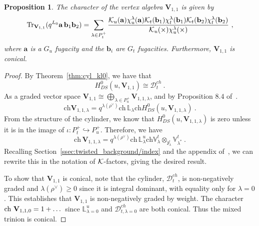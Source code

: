 \documentclass[a4paper]{article}
\newtheorem{prop}[thm]{Proposition}
\def\IV{\mathbb{V}}
\def\IL{\mathbb{L}}
\def\KK{{\cal K}}
\def\ch{{\rm ch}}
\def \zf{\mathfrak{z}}
\def\D{\mathcal{D}^{ch}}
\def\V{\mathbf{V}}
\begin{document}
\begin{prop}\label{prop:mixed_trin_char}
The character of the vertex algebra $\V_{1,1}$ is given by
\begin{equation*}
	\mathrm{Tr}_{\V_{1,1}}(q^{L_0}\mathbf{a}\,\mathbf{b}_1\mathbf{b}_2) = \sum_{\lambda\in P_t^+} \frac{\KK_u(\mathbf{a})\chi^\lambda_u(\mathbf{a})\KK_t(\mathbf{b}_1)\chi_t^\lambda(\mathbf{b}_1)\KK_t(\mathbf{b}_2) \chi_t^\lambda(\mathbf{b}_2)}{\KK_u(\times)\chi_u^\lambda(\times)} ~,
\end{equation*}
where $\mathbf{a}$ is a $G_u$ fugacity and the $\mathbf{b}_i$ are $G_t$ fugacities. Furthermore, $\V_{1,1}$ is conical.
\end{prop}
\begin{proof}
By Theorem~\ref{thm:cyl_kl0}, we have that
\begin{equation*}
	H^0_{DS}(u, \V_{1,1}) \cong \D_t~.
\end{equation*}
As a graded vector space $\V_{1,1}\cong \bigoplus_{\lambda\in P_u^+} \V_{1,1,\lambda}$, and by Proposition $8.4$ of~\cite{Arakawa:2018egx}.
\begin{equation*}
	\mathrm{ch} \V_{1,1,\lambda} = q^{\lambda(\rho^\vee)}\mathrm{ch}\, \mathbb{L}_\lambda \mathrm{ch}H^0_{DS}(u,\V_{1,1,\lambda})~.
\end{equation*}
From the structure of the cylinder, we know that $H^0_{DS}(u,\V_{1,1,\lambda})$ is zero unless it is in the image of $\iota:P_t^+ \hookrightarrow P_u^+$. Therefore, we have
\begin{equation*}
	\mathrm{ch}\, \V_{1,1,\lambda} = q^{\lambda(\rho^\vee)}\mathrm{ch}\, \mathbb{L}^u_\lambda \mathrm{ch} \IV^t_\lambda \otimes_{\zf^t_\lambda}\IV_{\lambda^*}^t~.
\end{equation*}
Recalling Section~\ref{ssec:twisted_background/index} and the appendix of~\cite{Lemos:2014lua}, we can rewrite this in the notation of $\KK$-factors, giving the desired result.

To show that $\V_{1,1}$ is conical, note that the cylinder, $\D_t$, is non-negatively graded and $\lambda(\rho^\vee)\geqslant 0$ since it is integral dominant, with equality only for $\lambda=0$. This establishes that $\V_{1,1}$ is non-negatively graded by weight. The character $\ch~ \V_{1,1,0}=1+\dots$ since $\IL_{\lambda=0}^u$ and $\D_{t,\lambda=0}$ are both conical. Thus the mixed trinion is conical.
\end{proof}
\end{document}
